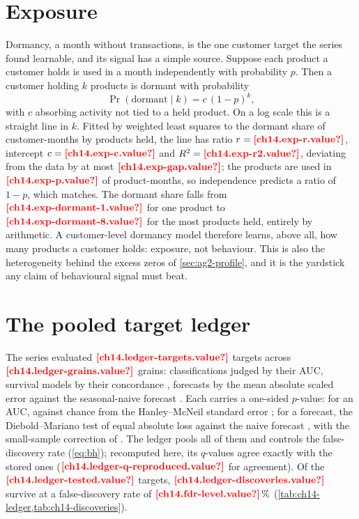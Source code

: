 \section{Exposure}\label{sec:ag2-exposure}

Dormancy, a month without transactions, is the one customer target the series found learnable, and its signal has a simple
source. Suppose each product a customer holds is used in a month independently with probability $p$. Then a customer
holding $k$ products is dormant with probability
\begin{equation}\label{eq:ag2-exposure}
  \Pr(\text{dormant} \mid k) = c\,(1 - p)^{k},
\end{equation}
with $c$ absorbing activity not tied to a held product. On a log scale this is a straight line in $k$. Fitted by weighted
least squares to the dormant share of customer-months by products held, the line has ratio $r = \est{ch14.exp-r}{value}$,
intercept $c = \est{ch14.exp-c}{value}$ and $R^2 = \est{ch14.exp-r2}{value}$, deviating from the data by at most
$\est{ch14.exp-gap}{value}$; the products are used in $\est{ch14.exp-p}{value}$ of product-months, so independence predicts a
ratio of $1 - p$, which matches. The dormant share falls from $\est{ch14.exp-dormant-1}{value}$ for one product to $\est{ch14.exp-dormant-8}{value}$ for the most products held, entirely by arithmetic. A customer-level dormancy model therefore learns, above
all, how many products a customer holds: exposure, not behaviour. This is also the heterogeneity behind the excess zeros of
\cref{sec:ag2-profile}, and it is the yardstick any claim of behavioural signal must beat.

\section{The pooled target ledger}\label{sec:ag2-ledger}

The series evaluated $\est{ch14.ledger-targets}{value}$ targets across $\est{ch14.ledger-grains}{value}$ grains:
classifications judged by their AUC, survival models by their concordance \autocite{harrell1982}, forecasts by the mean
absolute scaled error against the seasonal-naive forecast \autocite{hyndman2006}. Each carries a one-sided $p$-value: for an AUC, against chance from the Hanley--McNeil standard error \autocite{hanley1982}; for a forecast, the Diebold--Mariano test
of equal absolute loss against the naive forecast \autocite{diebold1995}, with the small-sample correction of
\textcite{harvey1997}. The ledger pools all of them and controls the false-discovery rate (\cref{eq:bh}); recomputed here, its
$q$-values agree exactly with the stored ones ($\est{ch14.ledger-q-reproduced}{value}$ for agreement). Of the
$\est{ch14.ledger-tested}{value}$ targets, $\est{ch14.ledger-discoveries}{value}$ survive at a false-discovery rate of $\est{ch14.fdr-level}{value}\,\%$ (\cref{tab:ch14-ledger,tab:ch14-discoveries}).

